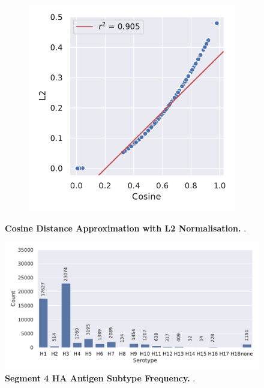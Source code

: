 \begin{figure}
\begin{subfigure}[b]{0.475\textwidth}
        \label{subfig:Normalisation_UMAP}            \includegraphics[width=\textwidth]{UMAP/Difference_Distance_Calculation.pdf}
    \end{subfigure}
    \caption[Cosine Distance Approximation with L2 Normalisation]{\textbf{Cosine Distance Approximation with L2 Normalisation.} .}
    \label{fig:Normalisation_Methods}
\end{figure}

\begin{figure}[!hbt]
    \centering
    \includegraphics[width=\textwidth]{PCA/Data_Overview_Segment_4_H.pdf}
    \caption[Segment 4 \Acrlong{HA} Antigen Subtype Frequency]{\textbf{Segment 4 \Acrlong{HA} Antigen Subtype Frequency.} .}
    \label{fig:Frequency_4}
\end{figure}

